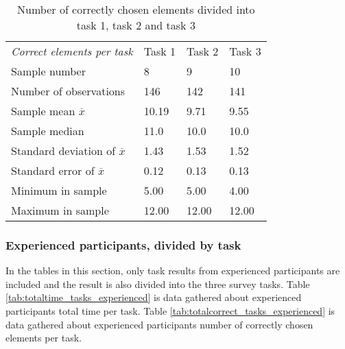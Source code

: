 \begin{table}[H]
	\centering
	\begin{tabular}{l|l|l|l}
		\textit{Correct elements per task} & Task 1 & Task 2 & Task 3\\ 
		Sample number & 8  & 9  & 10   \\ \hline
		Number of observations & 146    & 142     & 141        \\
		Sample mean $\overline{x}$ & 10.19  &  9.71  &   9.55   \\
		Sample median & 11.0 &  10.0  &  10.0   \\
		Standard deviation of $\overline{x}$ & 1.43  & 1.53 & 1.52    \\
		Standard error of $\overline{x}$ & 0.12 &  0.13 & 0.13  \\
		Minimum in sample  & 5.00  & 5.00  &   4.00  \\
		Maximum in sample  & 12.00 & 12.00  & 12.00 \\ \hline
	\end{tabular}
	\caption[Correct elements, divided into task 1, task 2 and task 3]{Number of correctly chosen elements divided into task 1, task 2 and task 3}
	\label{tab:totalcorrect_tasks}
\end{table}

\subsubsection{Experienced participants, divided by task}\label{sec:taskdivided_experienced}

In the tables in this section, only task results from experienced participants are included and the result is also divided into the three survey tasks. Table \ref{tab:totaltime_tasks_experienced} is data gathered about experienced participants total time per task. Table \ref{tab:totalcorrect_tasks_experienced} is data gathered about experienced participants number of correctly chosen elements per task.


